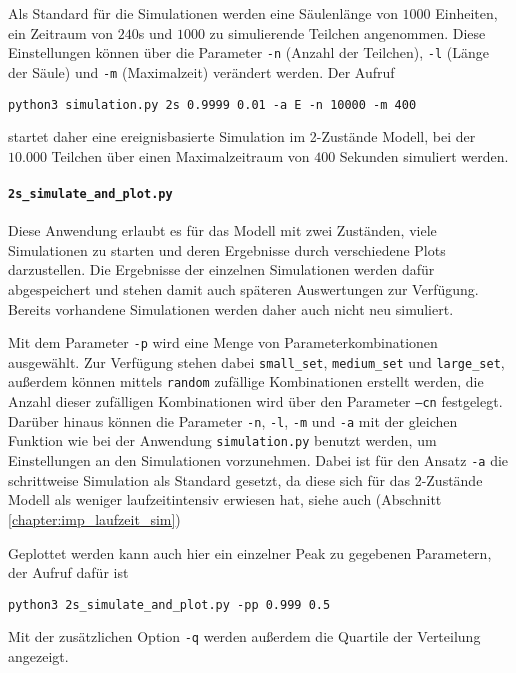 Als Standard für die Simulationen werden eine Säulenlänge von $1000$ Einheiten, ein Zeitraum von $240$s und $1000$ zu simulierende Teilchen angenommen. Diese Einstellungen können über die Parameter \texttt{-n} (Anzahl der Teilchen), \texttt{-l} (Länge der Säule) und \verb!-m! (Maximalzeit) verändert werden.
Der Aufruf
\begin{verbatim}
python3 simulation.py 2s 0.9999 0.01 -a E -n 10000 -m 400
\end{verbatim}
startet daher eine ereignisbasierte Simulation im 2-Zustände Modell, bei der $10.000$ Teilchen über einen Maximalzeitraum von $400$ Sekunden simuliert werden.


\paragraph{\texttt{2s\_simulate\_and\_plot.py}}
Diese Anwendung erlaubt es für das Modell mit zwei Zuständen, viele Simulationen zu starten und deren Ergebnisse durch verschiedene Plots darzustellen. Die Ergebnisse der einzelnen Simulationen werden dafür abgespeichert und stehen damit auch späteren Auswertungen zur Verfügung. Bereits vorhandene Simulationen werden daher auch nicht neu simuliert.

Mit dem Parameter \texttt{-p} wird eine Menge von Parameterkombinationen ausgewählt. Zur Verfügung stehen dabei \texttt{small\_set}, \texttt{medium\_set} und \texttt{large\_set}, außerdem können mittels \texttt{random} zufällige Kombinationen erstellt werden, die Anzahl dieser zufälligen Kombinationen wird über den Parameter \texttt{--cn} festgelegt. %
Darüber hinaus können die Parameter \texttt{-n}, \texttt{-l}, \texttt{-m} und \texttt{-a} mit der gleichen Funktion wie bei der Anwendung \texttt{simulation.py} benutzt werden, um Einstellungen an den Simulationen vorzunehmen. Dabei ist für den Ansatz \texttt{-a} die schrittweise Simulation als Standard gesetzt, da diese sich für das 2-Zustände Modell als weniger laufzeitintensiv erwiesen hat, siehe auch (Abschnitt \ref{chapter:imp_laufzeit_sim})

Geplottet werden kann auch hier ein einzelner Peak zu gegebenen Parametern, der Aufruf dafür ist
\begin{verbatim}
python3 2s_simulate_and_plot.py -pp 0.999 0.5 
\end{verbatim}
Mit der zusätzlichen Option \verb!-q! werden außerdem die Quartile der Verteilung angezeigt.

